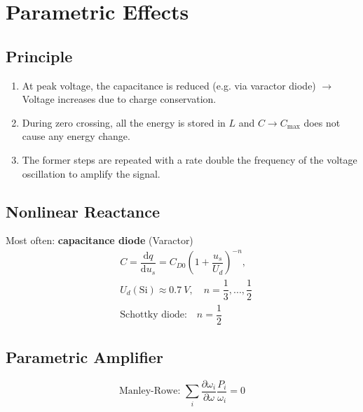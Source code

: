 \section{Parametric Effects}
\subsection{Principle}
\begin{enumerate}
    \itemsep0pt
    \item At peak voltage, the capacitance is reduced (e.g. via varactor diode) $\to$ Voltage increases due to charge conservation.
    \item During zero crossing, all the energy is stored in $L$ and $C\to C_{\mathrm{max}}$ does not cause any energy change.
    \item The former steps are repeated with a rate double the frequency of the voltage oscillation to amplify the signal.
\end{enumerate}
\subsection{Nonlinear Reactance}
Most often: \textbf{capacitance diode} (Varactor)
\begin{align*}
    &C = \dfrac{\mathrm{d}q}{\mathrm{d}u_s} = C_{D0} \left(1 + \dfrac{u_s}{U_d}\right)^{-n},\\
    &U_d(\mathrm{Si}) \approx \SI{0.7}{V}, \quad n = \dfrac{1}{3}, ..., \dfrac{1}{2}\\
    &\text{Schottky diode:} \quad n = \dfrac{1}{2}
\end{align*}
\subsection{Parametric Amplifier}
\begin{equation*}
    \text{Manley-Rowe: } \sum\limits_i \dfrac{\partial \omega_i}{\partial \omega} \dfrac{P_i}{\omega_i} = 0
\end{equation*}
